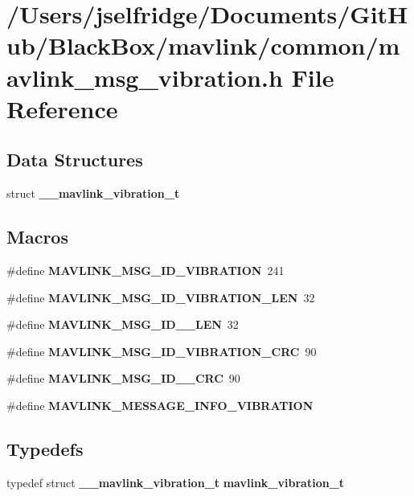 \section{/\+Users/jselfridge/\+Documents/\+Git\+Hub/\+Black\+Box/mavlink/common/mavlink\+\_\+msg\+\_\+vibration.h File Reference}
\label{mavlink__msg__vibration_8h}
\subsection*{Data Structures}
\begin{DoxyCompactItemize}
\item 
struct \textbf{ \+\_\+\+\_\+mavlink\+\_\+vibration\+\_\+t}
\end{DoxyCompactItemize}
\subsection*{Macros}
\begin{DoxyCompactItemize}
\item 
\#define \textbf{ M\+A\+V\+L\+I\+N\+K\+\_\+\+M\+S\+G\+\_\+\+I\+D\+\_\+\+V\+I\+B\+R\+A\+T\+I\+ON}~241
\item 
\#define \textbf{ M\+A\+V\+L\+I\+N\+K\+\_\+\+M\+S\+G\+\_\+\+I\+D\+\_\+\+V\+I\+B\+R\+A\+T\+I\+O\+N\+\_\+\+L\+EN}~32
\item 
\#define \textbf{ M\+A\+V\+L\+I\+N\+K\+\_\+\+M\+S\+G\+\_\+\+I\+D\+\_\+\_\+\+L\+EN}~32
\item 
\#define \textbf{ M\+A\+V\+L\+I\+N\+K\+\_\+\+M\+S\+G\+\_\+\+I\+D\+\_\+\+V\+I\+B\+R\+A\+T\+I\+O\+N\+\_\+\+C\+RC}~90
\item 
\#define \textbf{ M\+A\+V\+L\+I\+N\+K\+\_\+\+M\+S\+G\+\_\+\+I\+D\+\_\+\_\+\+C\+RC}~90
\item 
\#define \textbf{ M\+A\+V\+L\+I\+N\+K\+\_\+\+M\+E\+S\+S\+A\+G\+E\+\_\+\+I\+N\+F\+O\+\_\+\+V\+I\+B\+R\+A\+T\+I\+ON}
\end{DoxyCompactItemize}
\subsection*{Typedefs}
\begin{DoxyCompactItemize}
\item 
typedef struct \textbf{ \+\_\+\+\_\+mavlink\+\_\+vibration\+\_\+t} \textbf{ mavlink\+\_\+vibration\+\_\+t}
\end{DoxyCompactItemize}


